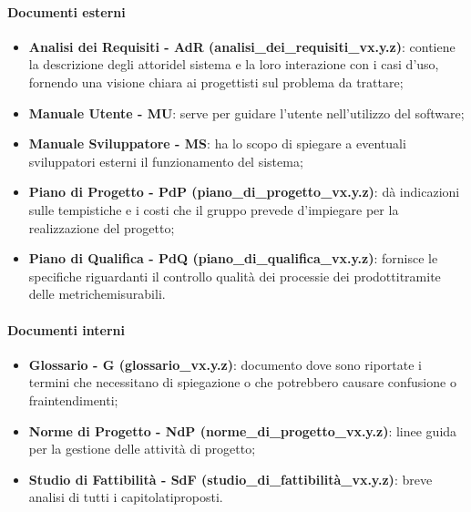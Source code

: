             \paragraph*{Documenti esterni}
                \begin{itemize}
                    \item \textbf{Analisi dei Requisiti - AdR (analisi\_dei\_requisiti\_vx.y.z)}: contiene la descrizione degli attori\glosp del sistema e la loro interazione con i casi d'uso\glo, fornendo una visione chiara ai progettisti sul problema da trattare;
                    \item \textbf{Manuale Utente - MU}: serve per guidare l'utente nell'utilizzo del software;
                    \item \textbf{Manuale Sviluppatore - MS}: ha lo scopo di spiegare a eventuali sviluppatori esterni il funzionamento
                                                              del sistema;
                    \item \textbf{Piano di Progetto - PdP (piano\_di\_progetto\_vx.y.z)}: dà indicazioni sulle tempistiche e i costi che il gruppo prevede d'impiegare
                                                                                       per la realizzazione del progetto\glo;
                    \item \textbf{Piano di Qualifica - PdQ (piano\_di\_qualifica\_vx.y.z)}: fornisce le specifiche riguardanti il controllo qualità dei processi\glosp e dei prodotti\glosp tramite delle metriche\glosp misurabili.
                \end{itemize}
            \paragraph*{Documenti interni}
                \begin{itemize}
                    \item \textbf{Glossario - G (glossario\_vx.y.z)}: documento dove sono riportate i termini che necessitano di spiegazione o che potrebbero causare confusione o fraintendimenti;
                    \item \textbf{Norme di Progetto - NdP (norme\_di\_progetto\_vx.y.z)}: linee guida per la gestione delle attività di progetto\glo;
                    \item \textbf{Studio di Fattibilità - SdF (studio\_di\_fattibilità\_vx.y.z)}: breve analisi di tutti i capitolati\glosp proposti.
                \end{itemize}
